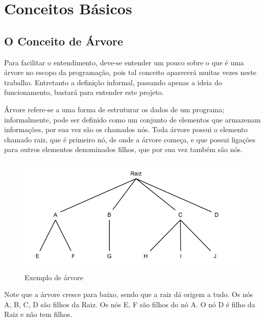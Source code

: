 
\chapter{Conceitos Básicos}
\label{cap:Conceitos Básicos}

\section{O Conceito de Árvore}

Para facilitar o entendimento, deve-se entender um pouco sobre o que
é uma árvore no escopo da programação, pois tal conceito aparecerá muitas
vezes neste trabalho. Entretanto a definição informal, passando apenas a ideia 
do funcionamento, bastará para entender este projeto.

Árvore refere-se a uma forma de estruturar os dados de um programa;
informalmente, pode ser definido como um conjunto de elementos que armazenam 
informações, por sua vez são os chamados nós. Toda árvore possui o elemento 
chamado raiz, que é primeiro nó, de onde a árvore começa, e que possui ligações
para outros elementos denominados filhos, que por sua vez também são nós.

\begin{figure}[h]
    \includegraphics[width=\linewidth]{../figuras/arvore.png}
    \caption{Exemplo de árvore}
\end{figure}   

Note que a árvore cresce para baixo, sendo que a raiz dá origem a tudo.
Os nós A, B, C, D são filhos da Raiz. Os nós E, F são filhos do nó A. O nó
D é filho da Raiz e não tem filhos.

